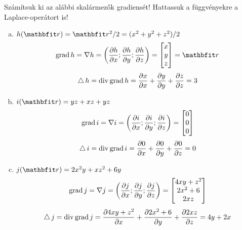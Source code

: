 \documentclass[exercise]{math-standalone}
\begin{document}
\begin{exercise}{
    Számítsuk ki az alábbi skalármezők gradiensét! Hattassuk a függvényekre
    a Laplace-operátort is!
  }
{\begin{enumerate}[a)]
      \item $h(\rvec r) = \rvec r^2 / 2 = (x^2 + y^2 + z^2) / 2$
            \[
              \grad h
              =
              \nabla h
              =
              \left(
              \pdv{h}{x}; \pdv{h}{y}; \pdv{h}{z}
              \right)
              =
              \begin{bmatrix}
                x \\ y \\ z
              \end{bmatrix}
              =
              \rvec r
            \]
            \[
              \operatorname{\triangle} h
              =
              \operatorname{div} \operatorname{grad} h
              =
              \pdv{x}{x} + \pdv{y}{y} + \pdv{z}{z}
              =
              3
            \]

      \item $i(\rvec r) = yz + xz + yz$
            \[
              \operatorname{grad} i
              =
              \nabla i
              =
              \left(
              \pdv{i}{x}; \pdv{i}{y}; \pdv{i}{z}
              \right)
              =
              \begin{bmatrix}
                0 \\ 0 \\ 0
              \end{bmatrix}
            \]
            \[
              \operatorname{\triangle} i
              =
              \operatorname{div} \operatorname{grad} i
              =
              \pdv{0}{x} + \pdv{0}{y} + \pdv{0}{z}
              =
              0
            \]

      \item $j(\rvec r) = 2 x^2 y + x z^2 + 6 y$
            \[
              \operatorname{grad} j
              =
              \nabla j
              =
              \left(
              \pdv{j}{x}; \pdv{j}{y}; \pdv{j}{z}
              \right)
              =
              \begin{bmatrix}
                4 x y + z^2 \\
                2 x^2 + 6   \\
                2 x z
              \end{bmatrix}
            \]
            \[
              \operatorname{\triangle} j
              =
              \operatorname{div} \operatorname{grad} j
              =
              \pdv{4 x y + z^2}{x} + \pdv{2 x^2 + 6}{y} + \pdv{2 x z}{z}
              =
              4 y + 2 x
            \]
    \end{enumerate}
  }
\end{exercise}
\end{document}
